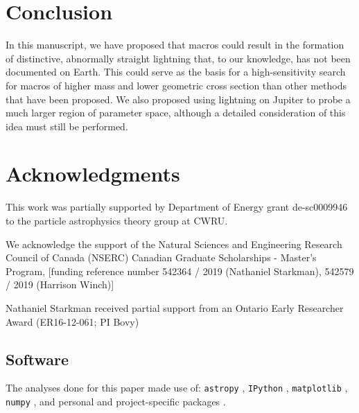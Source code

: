 \documentclass[%
 reprint,
 amsmath,amssymb,
 aps,
]{revtex4-2}
\newcommand{\vtwo}[1]{{\color{black} #1}}
\begin{document}

\section{Conclusion} %
\label{sec:conclusion}

    In this manuscript, we have proposed that macros could result in the formation of distinctive, abnormally straight lightning that, to our knowledge, has not been documented on Earth. This could serve as the basis for a high-sensitivity search for macros of higher mass and lower \vtwo{geometric} cross section than other methods that have been proposed. We also proposed using lightning on Jupiter to probe a much larger region of parameter space, although a detailed consideration of this idea must still be performed.



\medskip
\section{Acknowledgments} %
\label{sec:acknowledgements}

    This work was partially supported by Department of Energy grant de-sc0009946 to the particle astrophysics theory group at CWRU.

    We acknowledge the support of the Natural Sciences and Engineering Research Council of Canada (NSERC) Canadian Graduate Scholarships - Master's Program, [funding reference number 542364 / 2019 (Nathaniel Starkman), 542579 / 2019 (Harrison Winch)]
    
    \vtwo{Nathaniel Starkman received partial support from an Ontario Early Researcher Award (ER16-12-061; PI Bovy)}

    \subsection*{Software} %
    \label{sub:software_citation}

        \vtwo{The analyses done for this paper made use of: \texttt{astropy} \citet{code_Astropy2013, code_Astropy2018}, \texttt{IPython} \citet{code_Perez2007}, \texttt{matplotlib} \citet{code_Hunter2007}, \texttt{numpy} \citet{code_Walt2011}, and personal and project-specific packages \citet{code_utilipy2020, code_starkplot2020, code_macrolightning2020}.}
\end{document}
